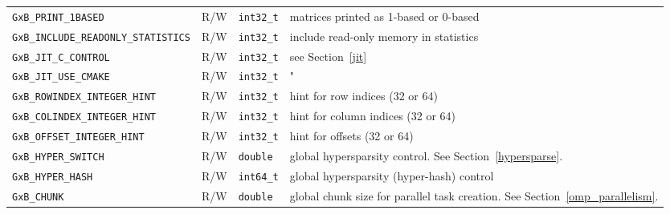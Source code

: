 {\begin{tabular}{|l|l|l|p{2.5in}|}
\verb'GxB_PRINT_1BASED'             & R/W  & \verb'int32_t'& matrices printed as 1-based or 0-based  \\
\verb'GxB_INCLUDE_READONLY_STATISTICS' &R/W& \verb'int32_t'& include read-only memory in statistics \\
\verb'GxB_JIT_C_CONTROL'            & R/W  & \verb'int32_t'& see Section~\ref{jit} \\
\verb'GxB_JIT_USE_CMAKE'            & R/W  & \verb'int32_t'& " \\
\verb'GxB_ROWINDEX_INTEGER_HINT'    & R/W  & \verb'int32_t'& hint for row indices (32 or 64) \\
\verb'GxB_COLINDEX_INTEGER_HINT'    & R/W  & \verb'int32_t'& hint for column indices (32 or 64) \\
\verb'GxB_OFFSET_INTEGER_HINT'      & R/W  & \verb'int32_t'& hint for offsets (32 or 64) \\
\hline
\verb'GxB_HYPER_SWITCH'             & R/W  & \verb'double' & global hypersparsity control. \newline
                                                                See Section~\ref{hypersparse}. \\
\verb'GxB_HYPER_HASH'               & R/W  & \verb'int64_t' & global hypersparsity (hyper-hash)
                                                                control \\
\verb'GxB_CHUNK'                    & R/W  & \verb'double' & global chunk size for parallel task creation.
                                                                See Section~\ref{omp_parallelism}. \\
\hline
\end{tabular}
}
\vspace{0.05in}

